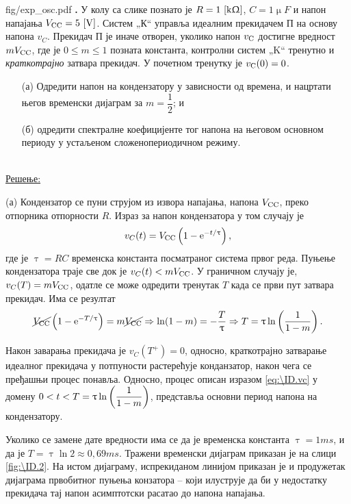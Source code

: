 \begin{slikaDesno}{fig/exp_osc.pdf}
\textbf{\ID.} У колу са слике познато је 
$R = 1\,\left[\mathrm{k\Upomega}\right]$, $C=1\unit{\upmu F}$ и 
напон напајања $V_{\rm CC} = 5\,\left[\mathrm{V}\right]$.
Систем „К“ управља идеалним прекидачем П 
на основу напона $v_{C}$. Прекидач П је иначе 
отворен, уколико напон $v_{\rm C}$ достигне вредност 
$mV_{\rm CC}$, где је $0 \leq m \leq 1$ позната 
константа, контролни систем „K“ тренутно и 
\textit{краткотрајно} затвара прекидач. У почетном 
тренутку је $v_{\rm C}(0) = 0$. 
\begin{enumerate}
\item[(а)] Одредити  напон 
на кондензатору у зависности од времена, и нацртати његов временски 
дијаграм за $m = \dfrac{1}{2}$; и
\item[(б)] одредити спектралне коефицијенте 
тог напона на његовом основном периоду у устаљеном 
сложенопериодичном режиму. 
\end{enumerate}
\end{slikaDesno} \\


\underline{\sc Решење:} 

(а) Кондензатор се пуни струјом из извора напајања, напона $V_{\rm CC}$,  
преко отпорника отпорности $R$. Израз за напон кондензатора у том случају је 
\begin{equation}
v_{C}(t) = V_{\rm CC} \left(
    1 - \ee^{-t/\uptau} 
\right), \label{eq:\ID.vc}
\end{equation} где је $\uptau = RC$ временска константа посматраног система првог реда. Пуњење кондензатора траје
све док је $v_C(t) < m V_{\rm CC}$. У граничном случају је, 
$v_C(T) = m V_{\rm CC}$, одатле се може одредити тренутак $T$ када се први пут затвара прекидач. 
Има се резултат
\begin{equation}
    \cancel {V_{\rm CC}} \left(
    1 - {\rm e}^{-T/\uptau} \right) = m \cancel{V_{\rm CC}}
    \Rightarrow \ln(1 - m) = -\dfrac{T}{\uptau} \Rightarrow 
    T = \uptau \ln \left( \dfrac{1}{1 - m} \right).
\end{equation}

Након заварања прекидача је $v_{C}(T^+) = 0$, односно, краткотрајно затварање идеалног прекидача 
у потпуности растерећује конданзатор, након чега се пређашњи процес понавља. 
Односно, процес описан изразом \eqref{eq:\ID.vc} у домену 
$\displaystyle 0 < t < T = \uptau \ln \left( \dfrac{1}{1 - m} \right)$, представља основни период напона
на кондензатору. 

Уколико се замене дате вредности има се да је временска константа 
$\uptau = 1\unit{ms}$, и да је $T = \uptau \ln 2 \approx 0,69 \unit{ms}$. 
Тражени временски дијаграм приказан је на слици \ref{fig:\ID.2}. На истом дијаграму, испрекиданом
линијом приказан је и продужетак дијаграма првобитног пуњења конзатора -- који илуструје да би 
у недостатку прекидача тај напон асимптотски расатао до напона напајања. 

